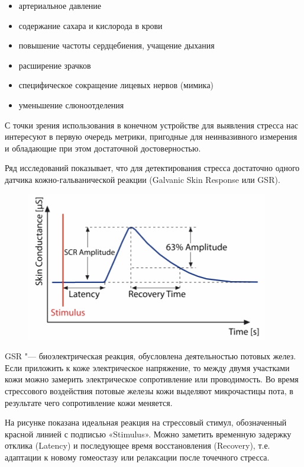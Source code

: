 \documentclass[10pt, a5paper]{article}
\begin{document}
\begin{itemize}
  \item артериальное давление
  \item содержание сахара и кислорода в крови
  \item повышение частоты сердцебиения, учащение дыхания
  \item расширение зрачков
  \item специфическое сокращение лицевых нервов (мимика)
  \item уменьшение слюноотделения
\end{itemize}

С точки зрения использования в конечном устройстве для выявления стресса нас интересуют в первую очередь метрики, пригодные для неинвазивного измерения и обладающие при этом достаточной достоверностью.

Ряд исследований показывает, что для детектирования стресса достаточно одного датчика кожно-гальванической реакции (Galva\-nic Skin Response или GSR).

\begin{figure}[h!]
  \centering
  \includegraphics{107_2014_w_Karabutova_plot.png}
\end{figure}

GSR "--- биоэлектрическая реакция, обусловлена деятельно\-стью потовых желез. Если приложить к коже электрическое напряжение, то между двумя участками кожи можно замерить электрическое сопротивление или проводимость. Во время стрессового воздействия потовые железы кожи выделяют микрочастицы пота, в результате чего сопротивление кожи меняется.

На рисунке показана идеальная реакция на стрессовый стимул, обозначенный красной линией с подписью «Stimulus». Можно заметить временную задержку отклика (Latency) и последующее время восстановления (Recovery), т.е. адаптации к новому гомеостазу или релаксации после точечного стресса.
\end{document}
